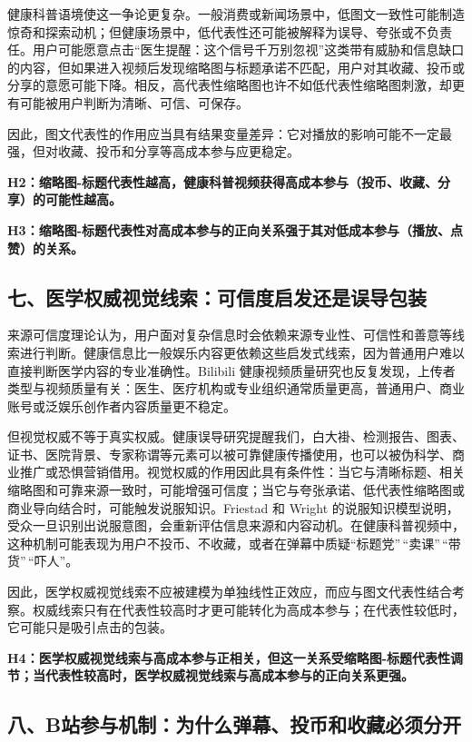 \documentclass[
  12pt,
]{article}
\begin{document}
健康科普语境使这一争论更复杂。一般消费或新闻场景中，低图文一致性可能制造惊奇和探索动机；但健康场景中，低代表性还可能被解释为误导、夸张或不负责任。用户可能愿意点击``医生提醒：这个信号千万别忽视''这类带有威胁和信息缺口的内容，但如果进入视频后发现缩略图与标题承诺不匹配，用户对其收藏、投币或分享的意愿可能下降。相反，高代表性缩略图也许不如低代表性缩略图刺激，却更有可能被用户判断为清晰、可信、可保存。

因此，图文代表性的作用应当具有结果变量差异：它对播放的影响可能不一定最强，但对收藏、投币和分享等高成本参与应更稳定。

\textbf{H2：缩略图-标题代表性越高，健康科普视频获得高成本参与（投币、收藏、分享）的可能性越高。}

\textbf{H3：缩略图-标题代表性对高成本参与的正向关系强于其对低成本参与（播放、点赞）的关系。}

\subsection{七、医学权威视觉线索：可信度启发还是误导包装}\label{ux4e03ux533bux5b66ux6743ux5a01ux89c6ux89c9ux7ebfux7d22ux53efux4fe1ux5ea6ux542fux53d1ux8fd8ux662fux8befux5bfcux5305ux88c5}

来源可信度理论认为，用户面对复杂信息时会依赖来源专业性、可信性和善意等线索进行判断。健康信息比一般娱乐内容更依赖这些启发式线索，因为普通用户难以直接判断医学内容的专业准确性。Bilibili
健康视频质量研究也反复发现，上传者类型与视频质量有关：医生、医疗机构或专业组织通常质量更高，普通用户、商业账号或泛娱乐创作者内容质量更不稳定。

但视觉权威不等于真实权威。健康误导研究提醒我们，白大褂、检测报告、图表、证书、医院背景、专家称谓等元素可以被可靠健康传播使用，也可以被伪科学、商业推广或恐惧营销借用。视觉权威的作用因此具有条件性：当它与清晰标题、相关缩略图和可靠来源一致时，可能增强可信度；当它与夸张承诺、低代表性缩略图或商业导向结合时，可能触发说服知识。Friestad
和 Wright
的说服知识模型说明，受众一旦识别出说服意图，会重新评估信息来源和内容动机。在健康科普视频中，这种机制可能表现为用户不投币、不收藏，或者在弹幕中质疑``标题党''\,``卖课''\,``带货''\,``吓人''。

因此，医学权威视觉线索不应被建模为单独线性正效应，而应与图文代表性结合考察。权威线索只有在代表性较高时才更可能转化为高成本参与；在代表性较低时，它可能只是吸引点击的包装。

\textbf{H4：医学权威视觉线索与高成本参与正相关，但这一关系受缩略图-标题代表性调节；当代表性较高时，医学权威视觉线索与高成本参与的正向关系更强。}

\subsection{八、B站参与机制：为什么弹幕、投币和收藏必须分开}\label{ux516bbux7ad9ux53c2ux4e0eux673aux5236ux4e3aux4ec0ux4e48ux5f39ux5e55ux6295ux5e01ux548cux6536ux85cfux5fc5ux987bux5206ux5f00}
\end{document}
